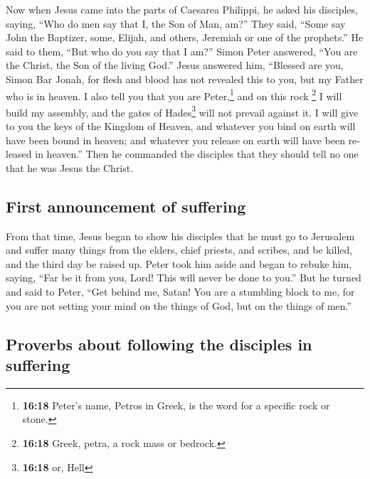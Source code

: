 \begin{paracol}{2}
\begin{otherlanguage}{english}
 Now when Jesus came into the parts of Caesarea Philippi,
he asked his disciples, saying, ``Who do men say that I, the Son of Man,
am?''  They said, ``Some say John the Baptizer, some,
Elijah, and others, Jeremiah or one of the prophets.'' 
He said to them, ``But who do you say that I am?''  Simon
Peter answered, ``You are the Christ, the Son of the living God.''
 Jesus answered him, ``Blessed are you, Simon Bar Jonah,
for flesh and blood has not revealed this to you, but my Father who is
in heaven.  I also tell you that you are
Peter,\footnote{\textbf{16:18} Peter's name, Petros in Greek, is the
  word for a specific rock or stone.} and on this rock \footnote{\textbf{16:18}
  Greek, petra, a rock mass or bedrock.} I will build my assembly, and
the gates of Hades\footnote{\textbf{16:18} or, Hell} will not prevail
against it.  I will give to you the keys of the Kingdom
of Heaven, and whatever you bind on earth will have been bound in
heaven; and whatever you release on earth will have been released in
heaven.''  Then he commanded the disciples that they
should tell no one that he was Jesus the Christ.

\hypertarget{first-announcement-of-suffering}{%
\subsection{First announcement of
suffering}\label{first-announcement-of-suffering}}

 From that time, Jesus began to show his disciples that
he must go to Jerusalem and suffer many things from the elders, chief
priests, and scribes, and be killed, and the third day be raised up.
 Peter took him aside and began to rebuke him, saying,
``Far be it from you, Lord! This will never be done to you.''
 But he turned and said to Peter, ``Get behind me, Satan!
You are a stumbling block to me, for you are not setting your mind on
the things of God, but on the things of men.''

\hypertarget{proverbs-about-following-the-disciples-in-suffering}{%
\subsection{Proverbs about following the disciples in
suffering}\label{proverbs-about-following-the-disciples-in-suffering}}


\end{otherlanguage}
\end{paracol}
